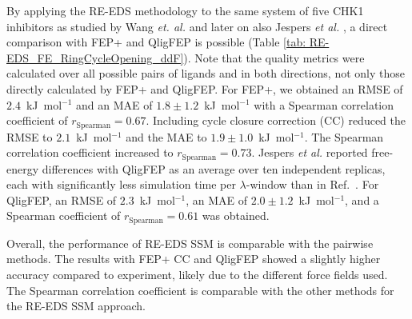 By applying the RE-EDS methodology to the same system of five CHK1 inhibitors as studied by Wang \textit{et. al.} \cite{Wang2017} and later on also Jespers \textit{et al.} \cite{Jespers2019}, a direct comparison with FEP+ and QligFEP is possible (Table \ref{tab: RE-EDS_FE_RingCycleOpening_ddF}). Note that the quality metrics were calculated over all possible pairs of ligands and in both directions, not only those directly calculated by FEP+ and QligFEP.
For FEP+, we obtained an RMSE of $2.4$~kJ~mol$^{-1}$ and an MAE of $1.8 \pm 1.2$~kJ~mol$^{-1}$ with a Spearman correlation coefficient of $r_{\text{Spearman}}=0.67$.
Including cycle closure correction (CC) \cite{Wang2017} reduced the RMSE to $2.1$~kJ~mol$^{-1}$ and the MAE to $1.9 \pm 1.0$~kJ~mol$^{-1}$. The Spearman correlation coefficient increased to $r_{\text{Spearman}}=0.73$.
Jespers \textit{et al.} \cite{Jespers2019} reported free-energy differences with QligFEP as an average over ten independent replicas, each with significantly less simulation time per $\lambda$-window than in Ref.~\cite{Wang2017}. For QligFEP, an RMSE of $2.3$~kJ~mol$^{-1}$, an MAE of $2.0 \pm 1.2$~kJ~mol$^{-1}$, and a Spearman coefficient of $r_{\text{Spearman}}=0.61$ was obtained.


Overall, the performance of RE-EDS SSM is comparable with the pairwise methods. The results with FEP+ CC and QligFEP showed a slightly higher accuracy compared to experiment, likely due to the different force fields used. The Spearman correlation coefficient is comparable with the other methods for the RE-EDS SSM approach.

